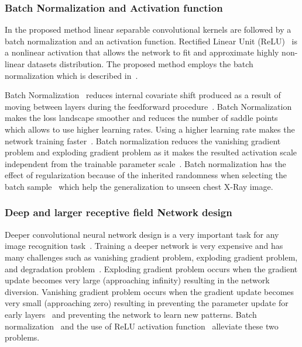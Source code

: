 \subsubsection{ Batch Normalization and  Activation function}

In the proposed method linear separable convolutional kernels are followed by a batch normalization and an activation function. Rectified Linear Unit (ReLU)~\cite{he2015delving} is a nonlinear activation that allows the network to fit and approximate highly non-linear datasets distribution. The proposed method employs the batch normalization which is described in~\cite{ioffe2015batch}. 

Batch Normalization~\cite{ioffe2015batch} reduces internal covariate shift produced as a result of  moving between layers during the feedforward procedure~\cite{ioffe2015batch}. Batch Normalization makes the loss landscape smoother and reduces the number of saddle points~\cite{santurkar2018does} which allows to use higher learning rates. Using a higher learning rate makes the network training  faster~\cite{ioffe2015batch}. Batch normalization reduces the vanishing gradient problem and exploding gradient problem as it makes the resulted activation scale independent from the trainable parameter scale~\cite{ioffe2015batch}. Batch normalization has the effect of regularization because of the inherited randomness when selecting the batch sample~\cite{ioffe2015batch} which help the generalization to unseen chest X-Ray image.

\subsubsection{ Deep and larger receptive field Network design}

Deeper convolutional neural network design is a very important task for any image recognition task~\cite{he2016deep}. Training a deeper network is very expensive and has many challenges such as vanishing gradient problem, exploding gradient problem, and degradation problem~\cite{he2016deep}. Exploding gradient problem occurs  when the  gradient update becomes very large (approaching infinity) resulting in the network diversion. Vanishing gradient problem occurs when the  gradient update becomes very small (approaching zero) resulting in preventing the parameter update for early layers~\cite{ioffe2015batch} and preventing the network to learn new patterns. Batch normalization~\cite{ioffe2015batch} and the use of ReLU activation function~\cite{krizhevsky2012imagenet} alleviate these two problems.

